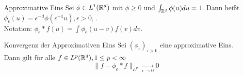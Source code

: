 	\begin{karte}{Approximative Eins}
		Sei $\phi \in L^{1}(\mathbb{R}^{d})$ mit $\phi \geq 0$ und $\int_{\mathbb{R}^{d}} \phi(u) du = 1$. Dann hei{\ss}t $\phi_{\epsilon}(u) = \epsilon^{-d} \phi(\epsilon^{-1} u), \epsilon > 0$,	. \\
		Notation: $\phi_{\epsilon} \ast f(u) = \int \phi_{\epsilon}(u - v) f(v) dv$.
	\end{karte}
	
	\begin{karte}{Konvergenz der Approximativen Eins}
		Sei $(\phi_{\epsilon})_{\epsilon > 0}$ eine approximative Eins. Dann gilt für alle $f \in L^{p}(\mathbb{R}^{d}), 1 \leq p < \infty$
		\[ \| f - \phi_{\epsilon} \ast f \|_{L^{p}} \xrightarrow[\epsilon \rightarrow 0]{} 0 \]	
	\end{karte}
